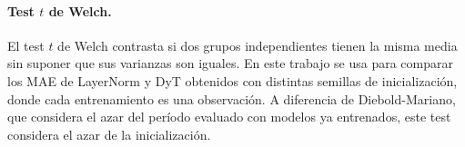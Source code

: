 \paragraph{Test $t$ de Welch.} El test $t$ de Welch \cite{Welch1947} contrasta si dos grupos independientes tienen la misma media sin suponer que sus varianzas son iguales. En este trabajo se usa para comparar los MAE de LayerNorm y DyT obtenidos con distintas semillas de inicialización, donde cada entrenamiento es una observación. A diferencia de Diebold-Mariano, que considera el azar del período evaluado con modelos ya entrenados, este test considera el azar de la inicialización.
